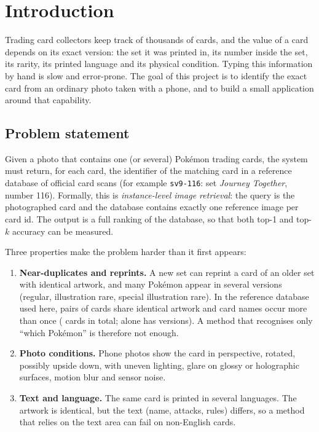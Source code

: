 \chapter{Introduction}
\label{ch:intro}


Trading card collectors keep track of thousands of cards, and the value of a card depends on its exact version: the set it was printed in, its number inside the set, its rarity, its printed language and its physical condition. Typing this information by hand is slow and error-prone. The goal of this project is to identify the exact card from an ordinary photo taken with a phone, and to build a small application around that capability.

\section{Problem statement}

Given a photo that contains one (or several) Pok\'emon trading cards, the system must return, for each card, the identifier of the matching card in a reference database of official card scans (for example \texttt{sv9-116}: set \emph{Journey Together}, number 116). Formally, this is \emph{instance-level image retrieval}: the query is the photographed card and the database contains exactly one reference image per card id. The output is a full ranking of the database, so that both top-1 and top-$k$ accuracy can be measured.

Three properties make the problem harder than it first appears:
\begin{enumerate}
  \item \textbf{Near-duplicates and reprints.} A new set can reprint a card of an older set with identical artwork, and many Pok\'emon appear in several versions (regular, illustration rare, special illustration rare). In the reference database used here,  pairs of cards share identical artwork and  card names occur more than once ( cards in total; \emph{} alone has  versions). A method that recognises only ``which Pok\'emon'' is therefore not enough.
  \item \textbf{Photo conditions.} Phone photos show the card in perspective, rotated, possibly upside down, with uneven lighting, glare on glossy or holographic surfaces, motion blur and sensor noise.
  \item \textbf{Text and language.} The same card is printed in several languages. The artwork is identical, but the text (name, attacks, rules) differs, so a method that relies on the text area can fail on non-English cards.
\end{enumerate}

